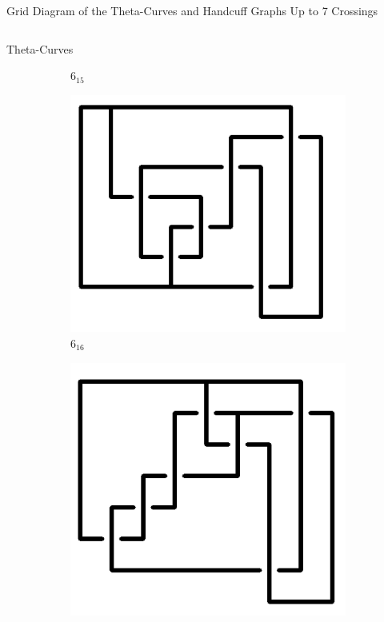 \documentclass[final]{beamer}
\begin{document}
\begin{frame}[t]
\begin{alertblock}{Grid Diagram of the Theta-Curves and Handcuff Graphs Up to 7 Crossings}
\begin{columns}[t]
\begin{column}{0.5\textwidth}
\begin{alertblock}{Theta-Curves}
\begin{figure}
\begin{subfigure}{0.075\textwidth}
    \caption{$6_{15}$} 
    \end{subfigure}
    \begin{subfigure}{0.075\textwidth}
    \includegraphics[width=\columnwidth]{../Midterm_Poster/grid_diagram/theta_6_16.png}
    \caption{$6_{16}$} 
    \end{subfigure}
    \begin{subfigure}{0.075\textwidth}
    \includegraphics[width=\columnwidth]{../Midterm_Poster/grid_diagram/theta_7_1.png}

\end{subfigure}
\end{figure}
\end{alertblock}
\end{column}
\end{columns}
\end{alertblock}
\end{frame}
\end{document}
